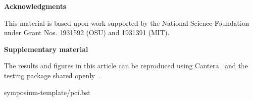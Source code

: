 \documentclass[twocolumn,10pt]{article}
\renewcommand{\section}%
              [1]%
              {%
               \bgroup%
               \flushleft%
               \small\bf%
               \stepcounter{section}%
               \arabic{section}. #1%
               \par%
               \egroup%
              }%
\newcommand{\acknowledgement}%
              [1]%
              {%
               \bgroup%
               \flushleft%
               \small\bf%
               #1%
               \par%
               \egroup%
              }%
\newcommand{\sectionOne}[1]{\section{#1} \addvspace{10pt}}
\newcommand{\symposiumpath}[1]{./}
\newcommand{\bibliographyControl}{
    symposium-template/pci.bst}
    
    }
\begin{document}

\acknowledgement{Acknowledgments} \addvspace{10pt}

This material is based upon work supported by the National Science Foundation under Grant Nos. 1931592 (OSU) and 1931391 (MIT).


\acknowledgement{Supplementary material} \addvspace{10pt}

The results and figures in this article can be reproduced using Cantera~\cite{cantera} and the testing package shared openly~\cite{testing_package}.

 \footnotesize
 \baselineskip 9pt





\newpage

\small
\baselineskip 10pt



\bibliographyControl
\end{document}

